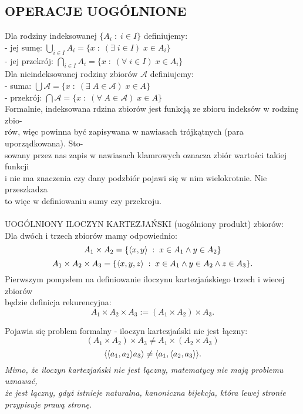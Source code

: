 \documentclass{article}
\begin{document}
\subsection{OPERACJE UOGÓLNIONE}
Dla {\color{def}rodziny indeksowanej} $\{A_i\;:\;i\in I\}$ definiujemy:\smallskip\\
    \indent - jej sumę: $\bigcup\limits_{i\in I}A_i = \{x\;:\;(\exists\;i\in I)\;x\in A_i\}$\smallskip\\
    \indent - jej przekrój: $\bigcap\limits_{i\in I}A_i=\{x\;:\;(\forall\;i\in I)\;x\in A_i\}$\medskip\\
Dla {\color{def}nieindeksowanej rodziny zbiorów} $\mathcal{A}$ definiujemy:\smallskip\\
    \indent - suma: $\bigcup\mathcal{A} = \{x\;:\;(\exists\;A\in\mathcal{A})\;x\in A\}$\smallskip\\
    \indent - przekrój: $\bigcap\mathcal{A}=\{x\;:\;(\forall\;A\in\mathcal{A})\;x\in A\}$\medskip\\
Formalnie, indeksowana rdzina zbiorów jest funkcją ze zbioru indeksów w rodzinę zbio-\\rów, więc powinna być zapisywana w nawiasach trójkątnych (para uporządkowana). Sto-\\sowany przez nas zapis w nawiasach klamrowych oznacza zbiór wartości takiej funkcji \\i nie ma znaczenia czy dany podzbiór pojawi się w nim wielokrotnie. Nie przeszkadza \\to więc w definiowaniu sumy czy przekroju.\bigskip\\

\bigskip\\

{\large{\color{def} UOGÓLNIONY ILOCZYN KARTEZJAŃSKI} (uogólniony produkt) zbiorów:}\medskip\\
Dla dwóch i trzech zbiorów mamy odpowiednio:
$$A_1\times A_2=\{\langle x,y\rangle\;:\;x\in A_1\land y\in A_2\}$$
$$A_1\times A_2\times A_3=\{\langle x,y,z\rangle\;:\;x\in A_1\land y\in A_2\land z\in A_3\}.$$
Pierwszym pomysłem na definiowanie iloczynu kartezjańskiego trzech i wiecej zbiorów \\będzie definicja rekurencyjna:
$$A_1\times A_2\times A_3:=(A_1\times A_2)\times A_3.$$

Pojawia się problem formalny - {\color{emp}iloczyn kartezjański nie jest łączny}:
$$(A_1\times A_2)\times A_3\neq A_1\times (A_2\times A_3)$$
$$\langle\langle a_1, a_2\rangle a_3\rangle\neq\langle a_1,\langle a_2,a_3\rangle\rangle.$$
\emph{Mimo, że iloczyn kartezjański nie jest łączny, matematycy nie mają problemu uznawać, \\że jest łączny, gdyż {\color{acc}istnieje naturalna, kanoniczna bijekcja}, która lewej stronie \\przypisuje prawą stronę.}\medskip\\
\end{document}
